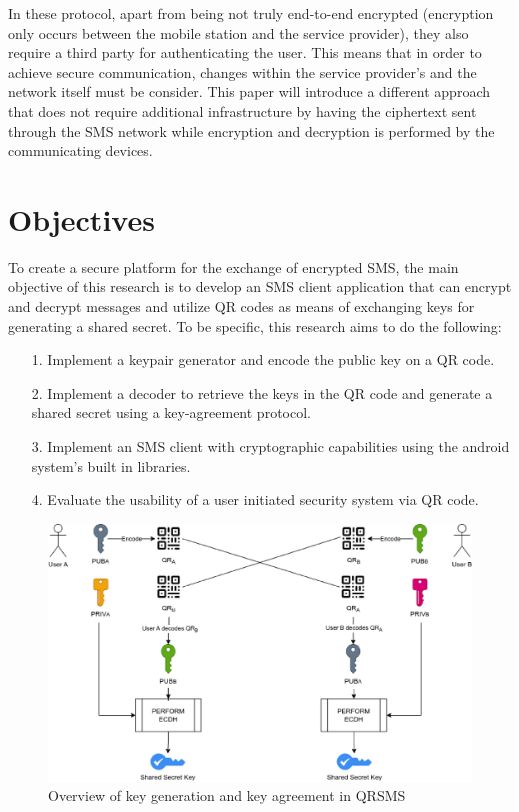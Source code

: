 \documentclass[journal]{./IEEE/IEEEtran}
\begin{document}
In these protocol, apart from being not truly end-to-end encrypted (encryption
only occurs between the mobile station and the service provider), they also
require a third party for authenticating the user. This means that in order to
achieve secure communication, changes within the service provider's and the
network itself must be consider. This paper will introduce a
different approach that does not require additional infrastructure by
having the ciphertext sent through the SMS network while encryption and
decryption is performed by the communicating devices.

\section{Objectives}
To create a secure platform for the exchange of encrypted SMS, the main
objective of this research is to develop an SMS client application that
can encrypt and decrypt messages and utilize QR codes as means of
exchanging keys for generating a shared secret. To be specific, this research
aims to do the following:
\begin{itemize}
	\item[1.] Implement a keypair generator and encode the public key on a
		QR code.
	\item[2.] Implement a decoder to retrieve the keys in the QR code and
		generate a shared secret using a key-agreement protocol.
	\item[3.] Implement an SMS client with cryptographic capabilities
		using the android system's built in libraries.
	\item[4.] Evaluate the usability of a user initiated security system
		via QR code.
\end{itemize}

\begin{figure}
	\centering
	\includegraphics[width=6in]{images/key_agreement.eps}
	\caption{Overview of key generation and key agreement in QRSMS}
	\label{key_genagree}
\end{figure}
\end{document}
